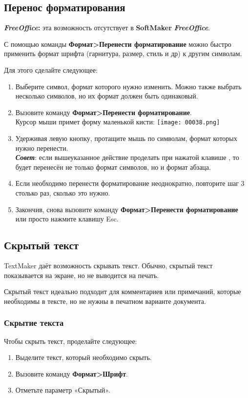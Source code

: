 \documentclass[a4paper,10pt]{article}
\begin{document}
\subsection{Перенос форматирования}

\begin{mdframed}[backgroundcolor=pink!50]
\textbf{\textit{FreeOffice}:} эта возможность отсутствует в \textbf{SoftMaker} \textit{\textbf{FreeOffice}}.
\end{mdframed}

С помощью команды \textbf{Формат>Перенести форматирование} можно быстро применить формат шрифта (гарнитура, размер, стиль и др) к другим символам.

Для этого сделайте следующее:
\begin{enumerate}
 \item Выберите символ, формат которого нужно изменить. Можно также выбрать несколько символов, но их формат должен быть одинаковый.
 \item Вызовите команду \textbf{Формат>Перенести форматирование}.\\
Курсор мыши примет форму маленькой кисти: \texttt{[image: 00038.png]}
\item Удерживая левую кнопку, протащите мышь по символам, формат которых нужно перенести.\\
\textit{\textbf{Совет}}: если вышеуказанное действие проделать при нажатой клавише , то будет перенесён не только формат символов, но и формат абзаца.
\item Если необходимо перенести форматирование неоднократно, повторите шаг 3 столько раз, сколько это нужно.
\item Закончив, снова вызовите команду \textbf{Формат>Перенести форматирование} или просто нажмите клавишу Esc.
\end{enumerate}

\subsection{Скрытый текст}
TextMaker даёт возможность скрывать текст. Обычно, скрытый текст показывается на экране, но не выводится на печать.

Скрытый текст идеально подходит для комментариев или примечаний, которые необходимы в тексте, но не нужны в печатном варианте документа.

\subsubsection{Скрытие текста}
Чтобы скрыть текст, проделайте следующее:
\begin{enumerate}
 \item Выделите текст, который необходимо скрыть.
 \item Вызовите команду \textbf{Формат>Шрифт}.
 \item Отметьте параметр «Скрытый».
\end{enumerate}
\end{document}
